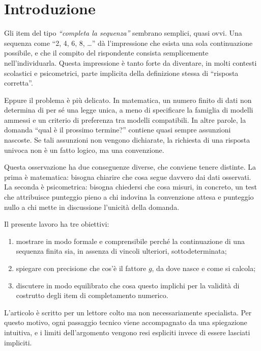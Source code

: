 \documentclass[10pt, a4paper]{article}
\theoremstyle{plain}
\theoremstyle{definition}
\theoremstyle{remark}
\begin{document}
\newpage
\tableofcontents
\newpage
\twocolumn

\section{Introduzione}
\label{sec:intro}

Gli item del tipo \emph{``completa la sequenza''} sembrano semplici, quasi
ovvi. Una sequenza come ``2, 4, 6, 8, \dots'' dà l'impressione che esista una
sola continuazione possibile, e che il compito del rispondente consista
semplicemente nell'individuarla. Questa impressione è tanto forte da diventare,
in molti contesti scolastici e psicometrici, parte implicita della definizione
stessa di ``risposta corretta''.

Eppure il problema è più delicato. In matematica, un numero finito di dati
non determina di per sé una legge unica, a meno di specificare la famiglia di
modelli ammessi e un criterio di preferenza tra modelli compatibili. In altre
parole, la domanda ``qual è il prossimo termine?'' contiene quasi sempre
assunzioni nascoste. Se tali assunzioni non vengono dichiarate, la richiesta di
una risposta univoca non è un fatto logico, ma una convenzione.

Questa osservazione ha due conseguenze diverse, che conviene tenere distinte.
La prima è matematica: bisogna chiarire che cosa segue davvero dai dati
osservati. La seconda è psicometrica: bisogna chiedersi che cosa misuri, in
concreto, un test che attribuisce punteggio pieno a chi indovina la convenzione
attesa e punteggio nullo a chi mette in discussione l'unicità della domanda.

Il presente lavoro ha tre obiettivi:
\begin{enumerate}[label=\arabic*.]
    \item mostrare in modo formale e comprensibile perché la continuazione di
          una sequenza finita sia, in assenza di vincoli ulteriori,
          sottodeterminata;
    \item spiegare con precisione che cos'è il fattore $g$, da dove nasce e
          come si calcola;
    \item discutere in modo equilibrato che cosa questo implichi per la
          validità di costrutto degli item di completamento numerico.
\end{enumerate}

L'articolo è scritto per un lettore colto ma non necessariamente specialista.
Per questo motivo, ogni passaggio tecnico viene accompagnato da una spiegazione
intuitiva, e i limiti dell'argomento vengono resi espliciti invece di essere
lasciati impliciti.
\end{document}
